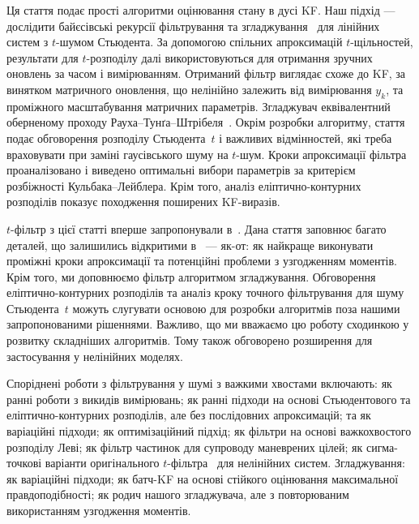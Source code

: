 \documentclass[]{article}
\renewcommand{\k}{_k}
\begin{document}
Ця стаття подає прості алгоритми оцінювання стану в дусі KF. Наш підхід — дослідити байєсівські рекурсії фільтрування та згладжування~\cite{sarkka_bayesian_2013} для лінійних систем з $t$-шумом Стьюдента. За допомогою спільних апроксимацій $t$-щільностей, результати для $t$-розподілу далі використовуються для отримання зручних оновлень за часом і вимірюванням. Отриманий фільтр виглядає схоже до KF, за винятком матричного оновлення, що нелінійно залежить від вимірювання $y\k$, та проміжного масштабування матричних параметрів. Згладжувач еквівалентний оберненому проходу Рауха--Тунґа--Штрібеля~\cite{sarkka_bayesian_2013, kailath_linear_2000}. Окрім розробки алгоритму, стаття подає обговорення розподілу Стьюдента~$t$ і важливих відмінностей, які треба враховувати при заміні гаусівського шуму на $t$-шум. Кроки апроксимації фільтра проаналізовано і виведено оптимальні вибори параметрів за критерієм розбіжності Кульбака--Лейблера. Крім того, аналіз еліптично-контурних розподілів показує походження поширених KF-виразів.

$t$-фільтр з цієї статті вперше запропонували в~\cite{roth_students_2013,roth_kalman_2013}. Дана стаття заповнює багато деталей, що залишились відкритими в~\cite{roth_students_2013} — як-от: як найкраще виконувати проміжні кроки апроксимації та потенційні проблеми з узгодженням моментів. Крім того, ми доповнюємо фільтр алгоритмом згладжування. Обговорення еліптично-контурних розподілів та аналіз кроку точного фільтрування для шуму Стьюдента~$t$ можуть слугувати основою для розробки алгоритмів поза нашими запропонованими рішеннями. Важливо, що ми вважаємо цю роботу сходинкою у розвитку складніших алгоритмів. Тому також обговорено розширення для застосування у нелінійних моделях.

Споріднені роботи з фільтрування у шумі з важкими хвостами включають: \cite{masreliez_approximate_1975, masreliez_robust_1977} як ранні роботи з викидів вимірювань; \cite{chu_estimation_1973,meinhold_robustification_1989, giron_bayesian_1994} як ранні підходи на основі Стьюдентового та еліптично-контурних розподілів, але без послідовних апроксимацій; \cite{agamennoni_approximate_2012,piche_recursive_2012} та \cite{nurminen_robust_2015} як варіаційні підходи; \cite{mattingley_real-time_2010} як оптимізаційний підхід; \cite{sornette_kalman-levy_2001,gordon_kalman-levy_2003} як фільтри на основі важкохвостого розподілу Леві; \cite{maskell_tracking_2004} як фільтр частинок для супроводу маневрених цілей; \cite{huang_robust_2016-1, tronarp_sigma-point_2016} як сигма-точкові варіанти оригінального $t$-фільтра~\cite{roth_students_2013} для нелінійних систем. Згладжування: \cite{ardeshiri_approximate_2015,huang_robust_2016} як варіаційні підходи; \cite{gandhi_robust_2010} як батч-KF на основі стійкого оцінювання максимальної правдоподібності; \cite{huang_robust_2016-1} як родич нашого згладжувача, але з повторюваним використанням узгодження моментів.
\end{document}
